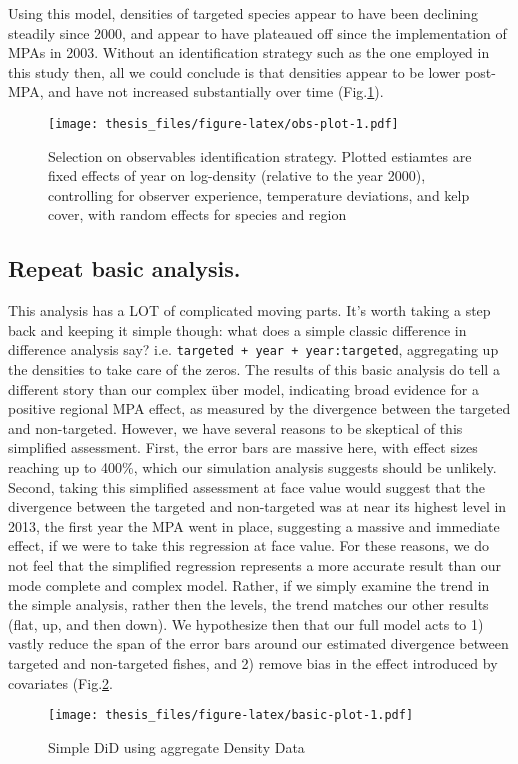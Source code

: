 \documentclass[twoside,12pt,final]{ucthesis-CA2012}
\begin{document}
\begin{ucmainmatter}
Using this model, densities of targeted species appear to have been
declining steadily since 2000, and appear to have plateaued off since
the implementation of MPAs in 2003. Without an identification strategy
such as the one employed in this study then, all we could conclude is
that densities appear to be lower post-MPA, and have not increased
substantially over time (Fig.\ref{fig:obs-plot}).
\begin{figure}
\centering
\texttt{[image: thesis\_files/figure-latex/obs-plot-1.pdf]}
\caption{\label{fig:obs-plot}Selection on observables identification
strategy. Plotted estiamtes are fixed effects of year on log-density
(relative to the year 2000), controlling for observer experience,
temperature deviations, and kelp cover, with random effects for species
and region}
\end{figure}
\subsection{Repeat basic analysis.}\label{repeat-basic-analysis.}

This analysis has a LOT of complicated moving parts. It's worth taking a
step back and keeping it simple though: what does a simple classic
difference in difference analysis say? i.e.
\texttt{targeted\ +\ year\ +\ year:targeted}, aggregating up the
densities to take care of the zeros. The results of this basic analysis
do tell a different story than our complex über model, indicating broad
evidence for a positive regional MPA effect, as measured by the
divergence between the targeted and non-targeted. However, we have
several reasons to be skeptical of this simplified assessment. First,
the error bars are massive here, with effect sizes reaching up to 400\%,
which our simulation analysis suggests should be unlikely. Second,
taking this simplified assessment at face value would suggest that the
divergence between the targeted and non-targeted was at near its highest
level in 2013, the first year the MPA went in place, suggesting a
massive and immediate effect, if we were to take this regression at face
value. For these reasons, we do not feel that the simplified regression
represents a more accurate result than our mode complete and complex
model. Rather, if we simply examine the trend in the simple analysis,
rather then the levels, the trend matches our other results (flat, up,
and then down). We hypothesize then that our full model acts to 1)
vastly reduce the span of the error bars around our estimated divergence
between targeted and non-targeted fishes, and 2) remove bias in the
effect introduced by covariates (Fig.\ref{fig:basic-plot}.
\begin{figure}
\centering
\texttt{[image: thesis\_files/figure-latex/basic-plot-1.pdf]}
\caption{\label{fig:basic-plot}Simple DiD using aggregate Density Data}
\end{figure}

\end{ucmainmatter}
\end{document}
